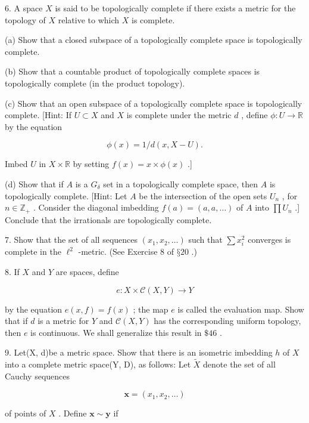 6. A space \(X\) is said to be topologically complete if there exists a metric for the topology of \(X\) relative to which \(X\) is complete.

(a) Show that a closed subspace of a topologically complete space is topologically complete.

(b) Show that a countable product of topologically complete spaces is topologically complete (in the product topology).

(c) Show that an open subspace of a topologically complete space is topologically complete. [Hint: If \(U \subset  X\) and \(X\) is complete under the metric \(d\) , define \(\phi  : U \rightarrow  \mathbb{R}\) by the equation

\[
\phi \left( x\right)  = 1/d\left( {x,X - U}\right) .
\]

Imbed \(U\) in \(X \times  \mathbb{R}\) by setting \(f\left( x\right)  = x \times  \phi \left( x\right)\) .]

(d) Show that if \(A\) is a \({G}_{\delta }\) set in a topologically complete space, then \(A\) is topologically complete. [Hint: Let \(A\) be the intersection of the open sets \({U}_{n}\) , for \(n \in  {\mathbb{Z}}_{ + }\) . Consider the diagonal imbedding \(f\left( a\right)  = \left( {a,a,\ldots }\right)\) of \(A\) into \(\prod {U}_{n}\) .] Conclude that the irrationals are topologically complete.

7. Show that the set of all sequences \(\left( {{x}_{1},{x}_{2},\ldots }\right)\) such that \(\sum {x}_{i}^{2}\) converges is complete in the \({\ell }^{2}\) -metric. (See Exercise 8 of \(§{20}\) .)

8. If \(X\) and \(Y\) are spaces, define

\[
e : X \times  \mathcal{C}\left( {X,Y}\right)  \rightarrow  Y
\]

by the equation \(e\left( {x,f}\right)  = f\left( x\right)\) ; the map \(e\) is called the evaluation map. Show that if \(d\) is a metric for \(Y\) and \(\mathcal{C}\left( {X,Y}\right)\) has the corresponding uniform topology, then \(e\) is continuous. We shall generalize this result in \(\$ {46}\) .

9. Let(X, d)be a metric space. Show that there is an isometric imbedding \(h\) of \(X\) into a complete metric space(Y, D), as follows: Let \(\widetilde{X}\) denote the set of all Cauchy sequences

\[
\mathbf{x} = \left( {{x}_{1},{x}_{2},\ldots }\right)
\]

of points of \(X\) . Define \(\mathbf{x} \sim  \mathbf{y}\) if

